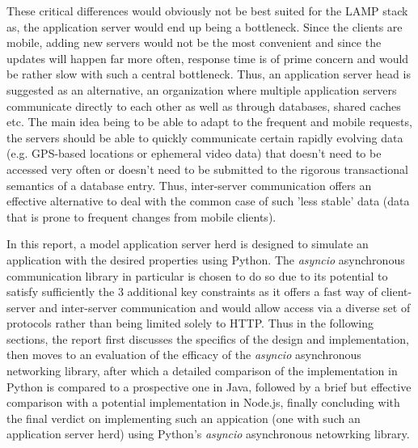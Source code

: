 \noindent These critical differences would obviously not be best suited for the LAMP stack as, the application server would end up being a bottleneck. Since the clients are mobile, adding new servers would not be the most convenient and since the updates will happen far more often, response time is of prime concern and would be rather slow with such a central bottleneck. Thus, an application server head is suggested as an alternative, an organization where multiple application servers communicate directly to each other as well as through databases, shared caches etc. The main idea being to be able to adapt to the frequent and mobile requests, the servers should be able to quickly communicate certain rapidly evolving data (e.g. GPS-based locations or ephemeral video data) that doesn't need to be accessed very often or doesn't need to be submitted to the rigorous transactional semantics of a database entry. Thus, inter-server communication offers an effective alternative to deal with the common case of such 'less stable' data (data that is prone to frequent changes from mobile clients). \newline

\noindent In this report, a model application server herd is designed to simulate an application with the desired properties using Python. The \emph{asyncio} asynchronous communication library in particular is chosen to do so due to its potential to satisfy sufficiently the 3 additional key constraints as it offers a fast way of client-server and inter-server communication and would allow access via a diverse set of protocols rather than being limited solely to HTTP. Thus in the following sections, the report first discusses the specifics of the design and implementation, then moves to an evaluation of the efficacy of the \emph{asyncio} asynchronous networking library, after which a detailed comparison of the implementation in Python is compared to a prospective one in Java, followed by a brief but effective comparison with a potential implementation in Node.js, finally concluding with the final verdict on implementing such an appication (one with such an application server herd) using Python's \emph{asyncio} asynchronous netowrking library. 

